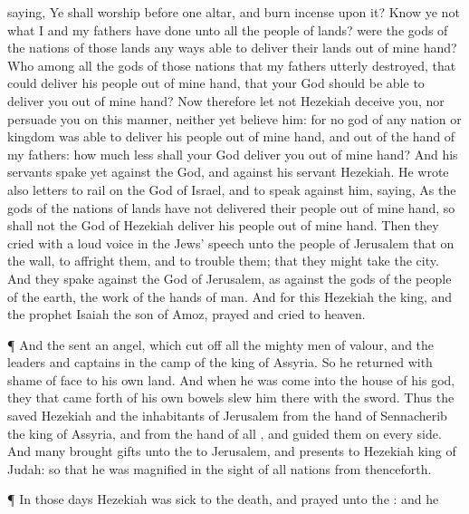 {saying, Ye shall
worship
before
one
altar, and burn
incense upon it?
Know ye not what I and my
fathers have
done unto all the
people of
{}
lands? were the
gods of the
nations of those
lands any
ways
able to
deliver their
lands out of mine
hand?
Who
{} among all the
gods of those
nations that my
fathers utterly
destroyed, that
could
deliver his
people out of mine
hand, that your
God should be
able to
deliver you out of mine
hand?
Now therefore let
not
Hezekiah
deceive you, nor
persuade you on this manner, neither yet
believe him: for no
god of any
nation or
kingdom was
able to
deliver his
people out of mine
hand, and out of the
hand of my
fathers: how much less shall your
God
deliver you out of mine
hand?
And his
servants
spake yet
{} against the
{}
God, and against his
servant
Hezekiah.
He
wrote also
letters to
rail on the
{}
God of
Israel, and to
speak against him,
saying, As the
gods of the
nations of
{}
lands have not
delivered their
people out of mine
hand, so shall not the
God of
Hezekiah
deliver his
people out of mine
hand.
Then they
cried with a
loud
voice in the
Jews’ speech unto the
people of
Jerusalem that
{} on the
wall, to
affright them, and to
trouble them; that they might
take the
city.
And they
spake
against the
God of
Jerusalem, as against the
gods of the
people of the
earth,
{} the
work of the
hands of
man.
And for this
{}
Hezekiah the
king, and the
prophet
Isaiah the
son of
Amoz,
prayed and
cried to
heaven.
\par }{\PP {}¶ And the
{}
sent an
angel, which cut
off all the mighty
men of
valour, and the
leaders and
captains in the
camp of the
king of
Assyria. So he
returned with
shame of
face to his own
land. And when he was
come into the
house of his
god, they that came
forth of his own
bowels
slew him there with the
sword.
Thus the
{}
saved
Hezekiah and the
inhabitants of
Jerusalem from the
hand of
Sennacherib the
king of
Assyria, and from the
hand of all
{}, and
guided them on every
side.
And
many
brought
gifts unto the
{} to
Jerusalem, and
presents to
Hezekiah
king of
Judah: so that he was
magnified in the
sight of all
nations from
thenceforth.
\par }{\PP {}¶ In those
days
Hezekiah was
sick to the
death, and
prayed unto the
{}: and he
}
